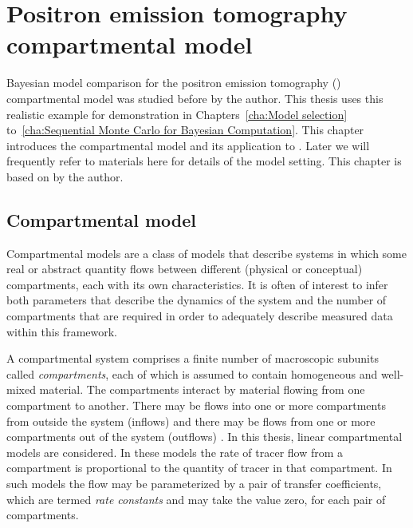 \chapter{Positron emission tomography compartmental model}
\label{cha:Positron emission tomography compartmental model}

Bayesian model comparison for the positron emission tomography (\pet)
compartmental model was studied before by the author. This thesis uses this
realistic example for demonstration in Chapters~\ref{cha:Model selection}
to~\ref{cha:Sequential Monte Carlo for Bayesian Computation}. This chapter
introduces the compartmental model and its application to \pet. Later we will
frequently refer to materials here for details of the model setting. This
chapter is based on \cite{Zhou2013} by the author.

\section{Compartmental model}
\label{sec:Compartmental model}

Compartmental models are a class of models that describe systems in which
some real or abstract quantity flows between different (physical or
conceptual) compartments, each with its own characteristics. It is often of
interest to infer both parameters that describe the dynamics of the system
and the number of compartments that are required in order to adequately
describe measured data within this framework.

A compartmental system comprises a finite number of macroscopic subunits
called \emph{compartments}, each of which is assumed to contain homogeneous
and well-mixed material. The compartments interact by material flowing from
one compartment to another. There may be flows into one or more compartments
from outside the system (inflows) and there may be flows from one or more
compartments out of the system (outflows) \cite{Jacquez:1996gc}. In this
thesis, linear compartmental models are considered. In these models the rate
of tracer flow from a compartment is proportional to the quantity of tracer
in that compartment. In such models the flow may be parameterized by a pair
of transfer coefficients, which are termed \emph{rate constants} and may take
the value zero, for each pair of compartments.

